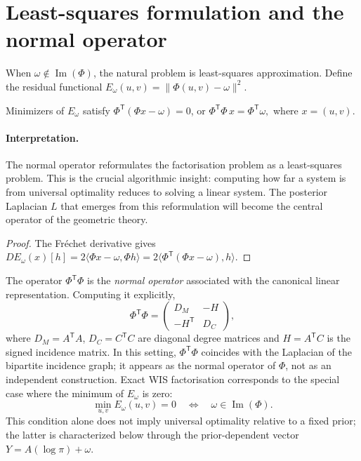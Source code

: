 \section{Least-squares formulation and the normal operator}\label{ch:sec:least-squares-formulation-and-the-normal-operator}
When $\omega\notin\operatorname{Im}(\Phi)$, the natural problem is least-squares approximation.
Define the residual functional
$E_\omega(u,v)=\|\Phi(u,v)-\omega\|^2.$
\begin{theorem}\label{ch:thm:normal-equations}
Minimizers of $E_\omega$ satisfy $\Phi^{\mathsf T}(\Phi x-\omega)=0$, or $\Phi^{\mathsf T}\Phi\,x=\Phi^{\mathsf T}\omega,$ where $x=(u,v)$.
\end{theorem}

\paragraph{Interpretation.}
The normal operator reformulates the factorisation problem as a least-squares problem.  This is the crucial algorithmic insight: computing how far a system is from universal optimality reduces to solving a linear system.  The posterior Laplacian $L$ that emerges from this reformulation will become the central operator of the geometric theory.

\begin{proof}
The Fr\'echet derivative gives
$DE_\omega(x)[h]=2\langle\Phi x-\omega,\Phi h\rangle
=2\langle\Phi^{\mathsf T}(\Phi x-\omega),h\rangle$.
\end{proof}

The operator $\Phi^{\mathsf T}\Phi$ is the \emph{normal operator} associated with the canonical linear representation.  Computing it explicitly,
\[
\Phi^{\mathsf T}\Phi=
\begin{pmatrix}
D_M & -H\\
-H^{\mathsf T} & D_C
\end{pmatrix},
\]
where $D_M=A^{\mathsf T}A$, $D_C=C^{\mathsf T}C$ are diagonal degree matrices and $H=A^{\mathsf T}C$ is the signed incidence matrix.  In this setting, $\Phi^{\mathsf T}\Phi$ coincides with the Laplacian of the bipartite incidence graph; it appears as the normal operator of $\Phi$, not as an independent construction.
Exact WIS factorisation corresponds to the special case where the minimum of $E_\omega$ is zero:
\[
\min_{u,v} E_\omega(u,v)=0 \quad\Longleftrightarrow\quad \omega\in\operatorname{Im}(\Phi).
\]
This condition alone does not imply universal optimality relative to a
fixed prior; the latter is characterized below through the prior-dependent
vector $Y=A(\log\pi)+\omega$.
